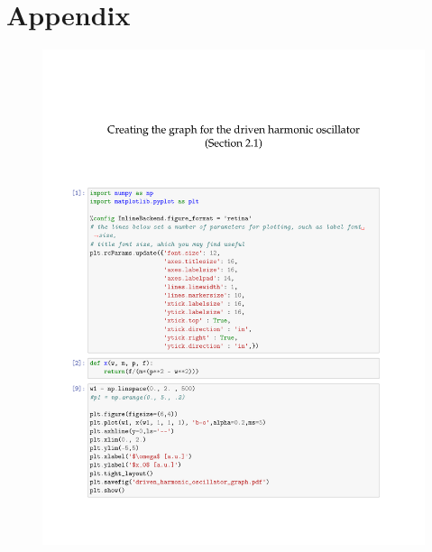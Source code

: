 \documentclass[12pt]{article}
\begin{document}
\section{Appendix}
\begin{figure}[hbt]
	\includegraphics[width=.96\textwidth]{python_code_c4.pdf}
\end{figure}
\clearpage



\end{document}
